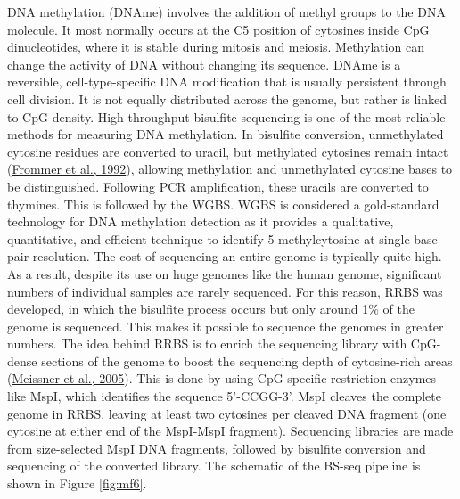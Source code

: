 \documentclass[12pt,twoside]{reedthesis}
\begin{document}
DNA methylation (DNAme) involves the addition of methyl groups to the
DNA molecule. It most normally occurs at the C5 position of cytosines
inside CpG dinucleotides, where it is stable during mitosis and meiosis.
Methylation can change the activity of DNA without changing its
sequence. DNAme is a reversible, cell-type-specific DNA modification
that is usually persistent through cell division. It is not equally
distributed across the genome, but rather is linked to CpG density.
High-throughput bisulfite sequencing is one of the most reliable methods
for measuring DNA methylation. In bisulfite conversion, unmethylated
cytosine residues are converted to uracil, but methylated cytosines
remain intact (\protect\hyperlink{ref-frommer1992}{Frommer et al., 1992}), allowing methylation and unmethylated
cytosine bases to be distinguished. Following PCR amplification, these
uracils are converted to thymines. This is followed by the WGBS. WGBS is
considered a gold-standard technology for DNA methylation detection as
it provides a qualitative, quantitative, and efficient technique to
identify 5-methylcytosine at single base-pair resolution. The cost of
sequencing an entire genome is typically quite high. As a result,
despite its use on huge genomes like the human genome, significant
numbers of individual samples are rarely sequenced. For this reason,
RRBS was developed, in which the bisulfite process occurs but only
around 1\% of the genome is sequenced. This makes it possible to sequence
the genomes in greater numbers. The idea behind RRBS is to enrich the
sequencing library with CpG-dense sections of the genome to boost the
sequencing depth of cytosine-rich areas (\protect\hyperlink{ref-meissner2005}{Meissner et al., 2005}). This is done by
using CpG-specific restriction enzymes like MspI, which identifies the
sequence 5'-CCGG-3'. MspI cleaves the complete genome in RRBS, leaving
at least two cytosines per cleaved DNA fragment (one cytosine at either
end of the MspI-MspI fragment). Sequencing libraries are made from
size-selected MspI DNA fragments, followed by bisulfite conversion and
sequencing of the converted library. The schematic of the BS-seq
pipeline is shown in Figure \ref{fig:mf6}.
\end{document}
